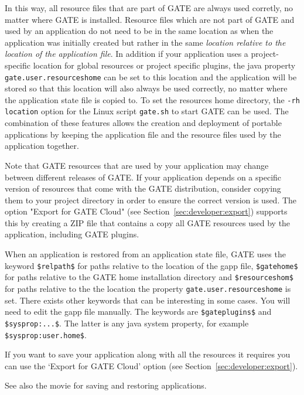 In this way, all resource files that are part of GATE are always used corretly,
no matter where GATE is installed. Resource files which are not part of GATE
and used by an application do not need to be in the same location as when the 
application was initially created but rather in the same \emph{location relative 
to the location of the application file}. 
In addition if your application uses a project-specific location for global
resources or project specific plugins, the java property \texttt{gate.user.resourceshome}
can be set to this location and the application will be stored so that this
location will also always be used correctly, no matter where the application state
file is copied to. To set the resources home directory, the \texttt{-rh location} 
option for the Linux script \texttt{gate.sh} to start GATE can be used.
The combination of these features allows the creation and deployment of portable
applications by keeping the application file and the resource files used by the
application together.


Note that GATE resources that are used by your application may change
between different releases of GATE. If your application depends on a specific 
version of resources that come with the GATE distribution, consider copying them
to your project directory in order to ensure the correct version is used.
The option "Export for GATE Cloud" (see
Section~\ref{sec:developer:export})
 supports this by creating a ZIP file that
contains a copy all GATE resources used by the application, including GATE plugins.

When an application is restored from an application state file, 
GATE uses the keyword \verb=$relpath$= for paths relative to the location of the
gapp file, \verb=$gatehome$= for paths relative to the GATE home installation directory
and \verb=$resourceshom$= for paths relative to the the location the property
\texttt{gate.user.resourceshome} is set. 
There exists other keywords that can be interesting in some
cases. You will need to edit the gapp file manually. The keywords are
\verb=$gateplugins$= and \verb=$sysprop:...$=. The latter is any java
system property, for example \verb=$sysprop:user.home$=.

If you want to save your application along with all the resources it requires
you can use the `Export for GATE Cloud' option (see
Section~\ref{sec:developer:export}).

See also the 
{movie for saving and restoring applications}.


